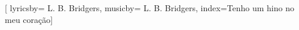 %

\setcounter{songnum}{35}

[
lyricsby={ L. B. Bridgers}, 
musicby={ L. B. Bridgers},
index={Tenho um hino no meu coração}]

